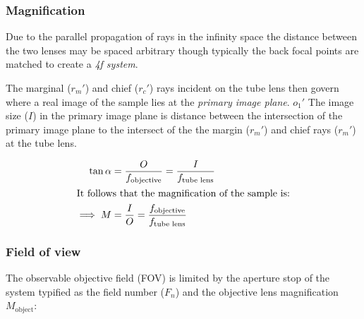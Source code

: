 \subsubsection{Magnification}

Due to the parallel propagation of rays in the infinity space the distance between the two lenses may be spaced arbitrary though typically the back focal points are matched to create a \emph{4f system}.

The marginal ($r_m'$) and chief ($r_c'$) rays incident on the tube lens then govern where a real image of the sample lies at the \emph{primary image plane}. %
$o_1'$
The image size ($I$) in the primary image plane is distance between the intersection of the primary image plane to the intersect of the the margin ($r_m'$) and chief rays ($r_m'$) at the tube lens.

\begin{align}
    \tan \alpha &= \frac{O}{f_{\text{objective}}} =  \frac{I}{f_{\text{tube lens}}} \\
    \intertext{It follows that the magnification of the sample is:}
    \implies M &= \frac{I}{O} = \frac{f_{\text{objective}}}
{f_{\text{tube lens}}}
\end{align}











\subsubsection{Field of view}

The observable objective field (FOV) is limited by the aperture stop of the system typified as the field number ($F_n $) and the objective lens magnification $M_{\text{object}}$:


